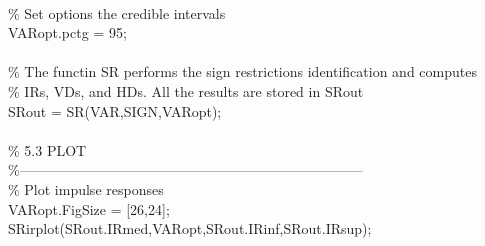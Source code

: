 \hspace{1mm}\hspace{5mm}  \\ 
\hspace{1mm}\hspace{5mm} \textcolor{matlabgreen}{\% Set options the credible intervals }\\ 
\hspace{1mm}\hspace{5mm} VARopt.pctg = 95; \\ 
\hspace{1mm}\hspace{5mm}  \\ 
\hspace{1mm}\hspace{5mm} \textcolor{matlabgreen}{\% The functin SR performs the sign restrictions identification and computes }\\ 
\hspace{1mm}\hspace{5mm} \textcolor{matlabgreen}{\% IRs, VDs, and HDs. All the results are stored in SRout }\\ 
\hspace{1mm}\hspace{5mm} SRout = SR(VAR,SIGN,VARopt); \\ 
\hspace{1mm}\hspace{5mm}  \\ 
\hspace{1mm}\hspace{5mm} \textcolor{matlabgreen}{\% 5.3 PLOT }\\ 
\hspace{1mm}\hspace{5mm} \textcolor{matlabgreen}{\%--------------------------------------------------------------------------  }\\ 
\hspace{1mm}\hspace{5mm} \textcolor{matlabgreen}{\% Plot impulse responses }\\ 
\hspace{1mm}\hspace{5mm} VARopt.FigSize = [26,24]; \\ 
\hspace{1mm}\hspace{5mm} SRirplot(SRout.IRmed,VARopt,SRout.IRinf,SRout.IRsup); \\ 
\hspace{1mm}\hspace{5mm}  \\ 
